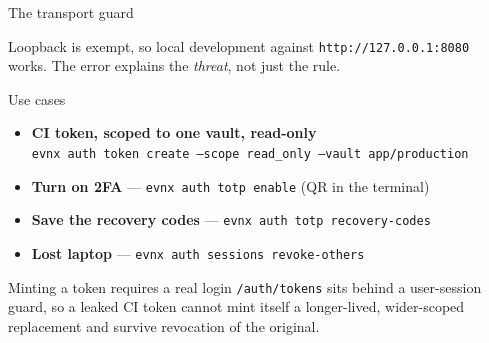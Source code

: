 \begin{frame}[fragile]{The transport guard}

  {\footnotesize Loopback is exempt, so local development against
  \texttt{http://127.0.0.1:8080} works. The error explains the \emph{threat},
  not just the rule.}
\end{frame}

\begin{frame}{Use cases}
  \begin{itemize}\footnotesize
    \item \textbf{CI token, scoped to one vault, read-only}\\
      \texttt{evnx auth token create --scope read\_only --vault app/production}
    \item \textbf{Turn on 2FA} — \texttt{evnx auth totp enable} (QR in the terminal)
    \item \textbf{Save the recovery codes} — \texttt{evnx auth totp recovery-codes}
    \item \textbf{Lost laptop} — \texttt{evnx auth sessions revoke-others}
  \end{itemize}

  \vspace{0.8em}
  \begin{block}{Minting a token requires a real login}
    \texttt{/auth/tokens} sits behind a user-session guard, so a leaked CI token
    cannot mint itself a longer-lived, wider-scoped replacement and survive
    revocation of the original.
  \end{block}
\end{frame}
